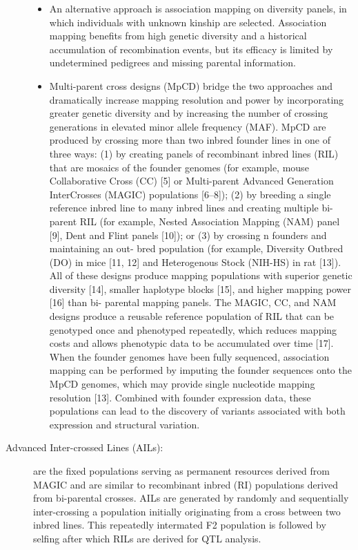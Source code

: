 \documentclass[a4paper,10pt]{article}
\begin{document}
\begin{description}
\begin{itemize}
\item An alternative approach is association mapping on diversity panels, in which individuals with unknown kinship are selected. 
Association mapping benefits from high genetic diversity and a historical accumulation of recombination events, but its efficacy is limited by undetermined pedigrees and missing parental information.

\item Multi-parent cross designs (MpCD) bridge the two approaches and dramatically increase mapping resolution and power by incorporating greater genetic diversity and by increasing the number of crossing generations in
elevated minor allele frequency (MAF). MpCD are produced by crossing more than two inbred founder lines in one of three ways: (1) by creating panels of recombinant inbred lines (RIL) that are mosaics of the founder
genomes (for example, mouse Collaborative Cross (CC) [5] or Multi-parent Advanced Generation InterCrosses
(MAGIC) populations [6–8]); (2) by breeding a single
reference inbred line to many inbred lines and creating
multiple bi-parent RIL (for example, Nested Association
Mapping (NAM) panel [9], Dent and Flint panels [10]);
or (3) by crossing n founders and maintaining an out-
bred population (for example, Diversity Outbred (DO) in
mice [11, 12] and Heterogenous Stock (NIH-HS) in rat
[13]). All of these designs produce mapping populations
with superior genetic diversity [14], smaller haplotype
blocks [15], and higher mapping power [16] than bi-
parental mapping panels. The MAGIC, CC, and NAM
designs produce a reusable reference population of RIL
that can be genotyped once and phenotyped repeatedly,
which reduces mapping costs and allows phenotypic data
to be accumulated over time [17]. When the founder
genomes have been fully sequenced, association mapping
can be performed by imputing the founder sequences
onto the MpCD genomes, which may provide single
nucleotide mapping resolution [13]. Combined with
founder expression data, these populations can lead to the
discovery of variants associated with both expression and
structural variation.
\end{itemize}

\item[Advanced Inter-crossed Lines (AILs):] are the fixed populations serving as permanent resources derived from MAGIC and are similar to recombinant inbred (RI) populations derived from bi-parental crosses. 
AILs are generated by randomly and sequentially inter-crossing a population initially originating from a cross between two inbred lines.
This repeatedly intermated F2 population is followed by selfing after which RILs are derived for QTL analysis.


\end{description}
\end{document}
